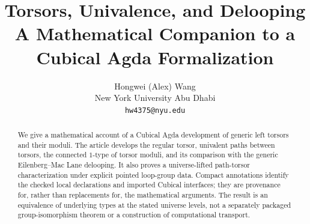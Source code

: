 \documentclass[11pt]{amsart}
\title[Torsors, Univalence, and Delooping]{Torsors, Univalence, and Delooping\\[0.35em]\large\textnormal{A Mathematical Companion to a Cubical Agda Formalization}}
\author{Hongwei (Alex) Wang\\[3pt]
\small New York University Abu Dhabi\\
\small \texttt{hw4375@nyu.edu}}
\begin{document}
\begin{abstract}
We give a mathematical account of a Cubical Agda development of generic left torsors and their moduli. The article develops the regular torsor, univalent paths between torsors, the connected $1$-type of torsor moduli, and its comparison with the generic Eilenberg--Mac Lane delooping. It also proves a universe-lifted path-torsor characterization under explicit pointed loop-group data. Compact annotations identify the checked local declarations and imported Cubical interfaces; they are provenance for, rather than replacements for, the mathematical arguments. The result is an equivalence of underlying types at the stated universe levels, not a separately packaged group-isomorphism theorem or a construction of computational transport.
\end{abstract}
\maketitle
\pagestyle{plain}








\appendix


\end{document}
